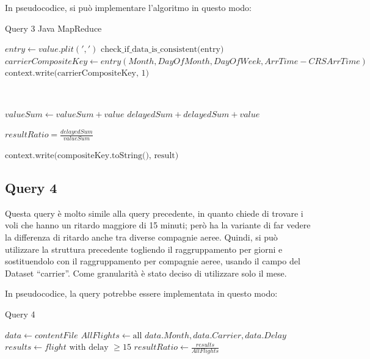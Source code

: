 \documentclass[11pt]{article} %
\begin{document}
In pseudocodice, si può implementare l'algoritmo in questo modo:

\newpage 

\begin{algorithm}
\caption{Query 3 Java MapReduce}\label{euclid}
\begin{algorithmic}[0]


\State $entry \gets value.plit(',')$
\State $\text{check\_if\_data\_is\_consistent(entry)}$
\State $carrierCompositeKey \gets entry(Month, DayOfMonth, DayOfWeek, ArrTime - CRSArrTime)$
\State $\text{context.write(carrierCompositeKey, 1)}$

\EndProcedure

~


	\State $valueSum \gets valueSum + value$
		\State $delayedSum + delayedSum + value$
	\EndIf
\EndFor

\State $resultRatio = \frac{delayedSum}{valueSum}$

\State $\text{context.write(compositeKey.toString(), result)}$

\EndProcedure


\end{algorithmic}
\end{algorithm}

\subsection{Query 4}

Questa query è molto simile alla query precedente, in quanto chiede di trovare i voli che hanno un ritardo maggiore di 15 minuti; però ha la variante di far vedere la differenza di ritardo anche tra diverse compagnie aeree. Quindi, si può utilizzare la struttura precedente togliendo il raggruppamento per giorni e sostituendolo con il raggruppamento per compagnie aeree, usando il campo del Dataset ``carrier''.  Come granularità è stato deciso di utilizzare solo il mese.

In pseudocodice, la query potrebbe essere implementata in questo modo:

\begin{algorithm}
\caption{Query 4}\label{euclid}
\begin{algorithmic}[0]
\State $data \gets contentFile$
\State $AllFlights \gets \text{all } data.Month, data.Carrier, data.Delay$
\State $results \gets flight \text{ with delay } \geqslant 15$
\State $resultRatio \gets \frac{results}{AllFlights}$
\EndFor
\end{algorithmic}
\end{algorithm}
\end{document}
